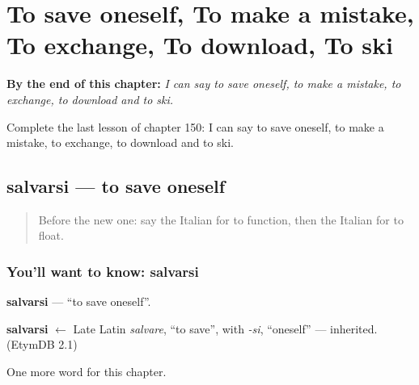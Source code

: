 
\chapter{To save oneself, To make a mistake, To exchange, To download, To ski}
\label{ch:it-to-save-oneself-to-make-a-mistake-to-exchange-to-download-to-ski}

\begin{chapteropening}
\textbf{By the end of this chapter:} \emph{I can say to save oneself, to make a mistake, to exchange, to download and to ski.}

Complete the last lesson of chapter 150: I can say to save oneself, to make a mistake, to exchange, to download and to ski.
\end{chapteropening}

\section[salvarsi]{salvarsi — to save oneself}

\label{lesson:IT-C150-salvarsi}



\begin{quote}
Before the new one: say the Italian for to function, then the Italian for to float.
\end{quote}

\subsection*{You'll want to know: salvarsi}
\textbf{salvarsi} — \textquotedblleft{}to save oneself\textquotedblright{}.

\begin{cousinweb}
\textbf{salvarsi} $\leftarrow$ Late Latin \emph{salvare}, \textquotedblleft{}to save\textquotedblright{}, with \emph{-si}, \textquotedblleft{}oneself\textquotedblright{} — inherited. (EtymDB 2.1)
\end{cousinweb}

\begin{grammarlens}[title={What you've built}]
One more word for this chapter.
\end{grammarlens}

